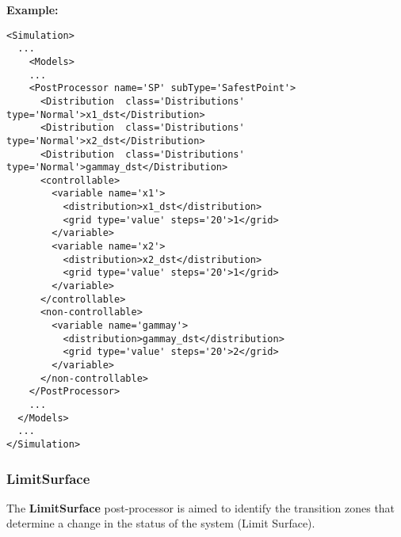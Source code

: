 \textbf{Example:}
\begin{lstlisting}[style=XML,morekeywords={name,subType,class,type,steps}]
<Simulation>
  ...
    <Models>
    ...
    <PostProcessor name='SP' subType='SafestPoint'>
      <Distribution  class='Distributions'  type='Normal'>x1_dst</Distribution>
      <Distribution  class='Distributions'  type='Normal'>x2_dst</Distribution>
      <Distribution  class='Distributions'  type='Normal'>gammay_dst</Distribution>
      <controllable>
        <variable name='x1'>
          <distribution>x1_dst</distribution>
          <grid type='value' steps='20'>1</grid>
        </variable>
        <variable name='x2'>
          <distribution>x2_dst</distribution>
          <grid type='value' steps='20'>1</grid>
        </variable>
      </controllable>
      <non-controllable>
        <variable name='gammay'>
          <distribution>gammay_dst</distribution>
          <grid type='value' steps='20'>2</grid>
        </variable>
      </non-controllable>
    </PostProcessor>
    ...
  </Models>
  ...
</Simulation>
\end{lstlisting}
\subsubsection{LimitSurface}
\label{LimitSurface}
The \textbf{LimitSurface} post-processor is aimed to identify the transition
zones that determine a change in the status of the system (Limit Surface).


